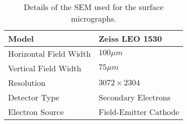 \begin{table}[H]
 \begin{center}
  \begin{tabular}{@{} *2l @{}} \toprule[2pt]
   Model & Zeiss LEO 1530 \\\midrule
   Horizontal Field Width & $100\mu m$   \\ 
   Vertical Field Width  & $75\mu m$ \\ 
   Resolution  & $3072\times 2304$ \\
   Detector Type & Secondary Electrons \\
   Electron Source & Field-Emitter Cathode \\ \bottomrule[2pt]

  \end{tabular}
 \end{center}
 \caption{Details of the SEM used for the surface micrographs.}
   \label{tab:SEM}
\end{table}
%
